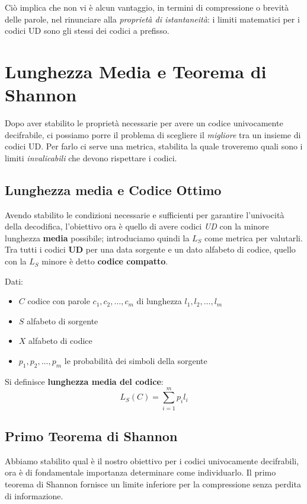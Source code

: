 Ciò implica che non vi è alcun vantaggio, in termini di compressione o brevità delle parole, nel rinunciare alla \textit{proprietà di istantaneità}: i limiti matematici per i codici UD sono gli stessi dei codici a prefisso.

\section{Lunghezza Media e Teorema di Shannon}
Dopo aver stabilito le proprietà necessarie per avere un codice univocamente decifrabile, ci possiamo porre il problema di scegliere il \textit{migliore} tra un insieme di codici UD. Per farlo ci serve una metrica, stabilita la quale troveremo quali sono i limiti \textit{invalicabili} che devono rispettare i codici.

\subsection{Lunghezza media e Codice Ottimo}
Avendo stabilito le condizioni necessarie e sufficienti per garantire l'univocità della decodifica, l'obiettivo ora è quello di avere codici \textit{UD} con la minore lunghezza \textbf{media} possibile; introduciamo quindi la \textbf{ $L_S$} come metrica per valutarli.
Tra tutti i codici \textbf{UD} per una data sorgente e un dato alfabeto di codice, quello con la $L_S$ minore è detto \textbf{codice compatto}.

Dati:
\begin{itemize}
    \item $C$ codice con parole $c_1,c_2,\dots,c_m$ di lunghezza $l_1,l_2,\dots,l_m$ 
    \item $S$ alfabeto di sorgente
    \item $X$ alfabeto di codice
    \item $p_1,p_2,\dots,p_m$ le probabilità dei simboli della sorgente
\end{itemize}

Si definisce \textbf{lunghezza media del codice}:
\[L_S(C)=\sum_{i=1}^m{p_il_i} \]


\subsection{Primo Teorema di Shannon}
\label{shannon1}
Abbiamo stabilito qual è il nostro obiettivo per i codici univocamente decifrabili, ora è di fondamentale importanza determinare come individuarlo. Il primo teorema di Shannon fornisce un limite inferiore per la compressione senza perdita di informazione.

